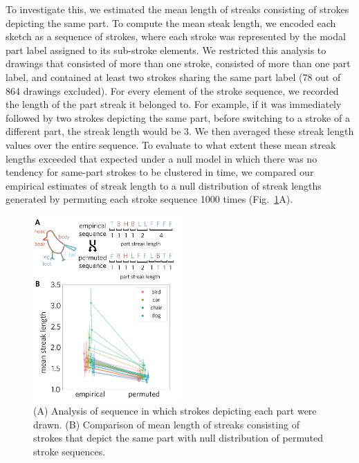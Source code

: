 \documentclass[10pt,letterpaper]{article}
\begin{document}
To investigate this, we estimated the mean length of streaks consisting of strokes depicting the same part.
To compute the mean steak length, we encoded each sketch as a sequence of strokes, where each stroke was represented by the modal part label assigned to its sub-stroke elements. 
We restricted this analysis to drawings that consisted of more than one stroke, consisted of more than one part label, and contained at least two strokes sharing the same part label (78 out of 864 drawings excluded). 
For every element of the stroke sequence, we recorded the length of the part streak it belonged to. 
For example, if it was immediately followed by two strokes depicting the same part, before switching to a stroke of a different part, the streak length would be 3. 
We then averaged these streak length values over the entire sequence. 
To evaluate to what extent these mean streak lengths exceeded that expected under a null model in which there was no tendency for same-part strokes to be clustered in time, we compared our empirical estimates of streak length to a null distribution of streak lengths generated by permuting each stroke sequence 1000 times (Fig.~\ref{stroke_sequence_fig}A). 

\begin{figure}[t]
\centering
\includegraphics[width=0.5\textwidth]{figures/6_part_sequence.pdf}
\caption{(A) Analysis of sequence in which strokes depicting each part were drawn. (B) Comparison of mean length of streaks consisting of strokes that depict the same part with null distribution of permuted stroke sequences.}
\label{stroke_sequence_fig}
\end{figure}
\end{document}
